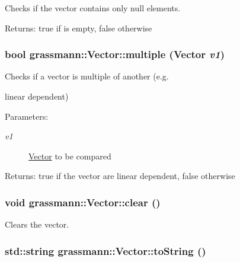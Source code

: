 Checks if the vector contains only null elements. 

\begin{Desc}
\item[Returns:]true if is empty, false otherwise \end{Desc}
\hypertarget{classgrassmann_1_1Vector_96dd7bb0a8a2620e34b8a3ac1342deff}{
\subsubsection[multiple]{\setlength{\rightskip}{0pt plus 5cm}bool grassmann::Vector::multiple ({\bf Vector} {\em v1})}}
\label{classgrassmann_1_1Vector_96dd7bb0a8a2620e34b8a3ac1342deff}


Checks if a vector is multiple of another (e.g. 

linear dependent) \begin{Desc}
\item[Parameters:]
\begin{description}
\item[{\em v1}]\hyperlink{classgrassmann_1_1Vector}{Vector} to be compared \end{description}
\end{Desc}
\begin{Desc}
\item[Returns:]true if the vector are linear dependent, false otherwise \end{Desc}
\hypertarget{classgrassmann_1_1Vector_c43808ba1c06b8e502b6a4430c674bd4}{
\subsubsection[clear]{\setlength{\rightskip}{0pt plus 5cm}void grassmann::Vector::clear ()}}
\label{classgrassmann_1_1Vector_c43808ba1c06b8e502b6a4430c674bd4}


Clears the vector. 

\hypertarget{classgrassmann_1_1Vector_2101413da90bea7fd2c911342b48cb60}{
\subsubsection[toString]{\setlength{\rightskip}{0pt plus 5cm}std::string grassmann::Vector::toString ()}}
\label{classgrassmann_1_1Vector_2101413da90bea7fd2c911342b48cb60}



